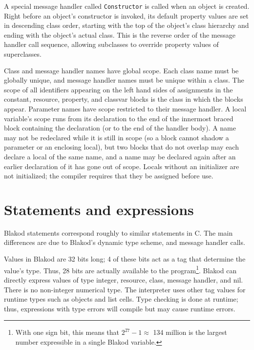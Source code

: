 \documentclass[12pt]{article}
\begin{document}
A special message handler called {\tt Constructor} is called when an
object is created.  Right before an object's constructor is invoked,
its default property values are set in descending class order,
starting with the top of the object's class hierarchy and ending with
the object's actual class.  This is the reverse order of the message
handler call sequence, allowing subclasses to override property values
of superclasses.

Class and message handler names have global scope. Each class name
must be globally unique, and message handler names must be unique
within a class.  The scope of all identifiers appearing on the left
hand sides of assignments in the constant, resource, property, and
classvar blocks is the class in which the blocks appear.  Parameter
names have scope restricted to their message handler.  A local
variable's scope runs from its declaration to the end of the innermost
braced block containing the declaration (or to the end of the handler
body).  A name may not be redeclared while it is still in scope (so a
block cannot shadow a parameter or an enclosing local), but two blocks
that do not overlap may each declare a local of the same name, and a
name may be declared again after an earlier declaration of it has gone
out of scope.  Locals without an initializer are not initialized; the
compiler requires that they be assigned before use.



\section{Statements and expressions}

Blakod statements correspond roughly to similar statements in C.  The
main differences are due to Blakod's dynamic type scheme, and message
handler calls.

Values in Blakod are 32 bits long; 4 of these bits act as a tag that
determine the value's type.  Thus, 28 bits are actually available to
the program\footnote{With one sign bit, this means that $2^{27} - 1
\approx $
134 million is the largest number expressible in a single Blakod
variable.}.  Blakod can directly express values of type integer,
resource, class, message handler, and nil.  There is no non-integer
numerical type.  The interpreter uses other tag values for runtime
types such as objects and list cells.  Type checking is done at
runtime; thus, expressions with type errors will compile but may cause
runtime errors.
\end{document}
